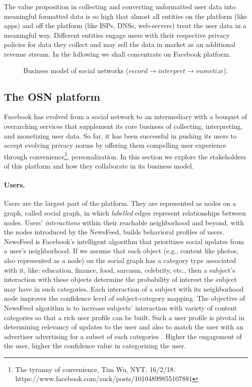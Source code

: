 \documentclass[a4paper,twoside]{article}
\begin{document}
%
The value proposition in collecting and converting unformatted user
data into meaningful formatted data is so high that almost all
entities on the platform (like apps) and off the platform (like ISPs,
DNSs, web-servers) treat the user data in a meaningful way. Different
entities engage users with their respective privacy policies for data
they collect and may sell the data in market as an additional revenue
stream. In the following we shall concentrate on Facebook platform.
%
\begin{figure*}[!h]
  \centering
  {}
  \caption{Business model of social networks
    ($record \rightarrow interpret \rightarrow monetize$).}
  \label{fig:business-model}
\end{figure*}

\subsection{The OSN platform}
\label{sec:osn-platform}
\noindent Facebook has evolved from a social network to an
intermediary with a bouquet of overarching services that supplement
its core business of collecting, interpreting, and monetizing user
data. So far, it has been successful in pushing its users to accept
evolving privacy norms by offering them compelling user experience
through convenience\footnote{The tyranny of convenience, Tim Wu, NYT,
  16/2/18.\\ https://www.facebook.com/zuck/posts/10104899855107881},
personalization. In this section we explore the stakeholders of this
platform and how they collaborate in its business model.

\paragraph{Users.}
Users are the largest part of the platform. They are represented as
nodes on a graph, called social graph, in which \textit{labelled}
edges represent relationships between nodes. Users'
\textit{interactions} within their reachable neighborhood and beyond,
with the nodes introduced by the NewsFeed, builds behavioral profiles
of users. NewsFeed is Facebook's intelligent algorithm that
prioritizes social updates from a user's neighborhood. If we assume
that each object (e.g., content like photos, also represented as a
node) on the social graph has a category type associated with it,
like: education, finance, food, sarcasm, celebrity, etc., then a
subject's interaction with these objects determine the probability of
interest the subject may have in such categories. Each interaction of
a subject with its neighborhood node improves the confidence level of
subject-category mapping. The objective of NewsFeed algorithm is to
increase subjects' interaction with variety of content categories
\cite{ipip-3200} so that a rich user profile can be built. Such a user
profile is pivotal in determining relevancy of updates to the user and
also to match the user with an advertiser advertising for a subset of
such categories \cite{fb-ad-categories}. Higher the engagement of the
user, higher the confidence value in categorizing the user.
\end{document}
